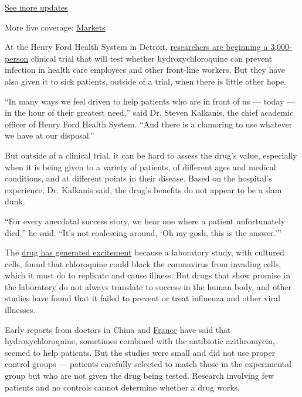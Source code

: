 \href{https://www.nytimes.com/2020/08/01/world/coronavirus-covid-19.html?action=click\&pgtype=Article\&state=default\&region=MAIN_CONTENT_1\&context=storylines_live_updates}{See
more updates}

More live coverage:
\href{https://www.nytimes.com/live/2020/07/31/business/stock-market-today-coronavirus?action=click\&pgtype=Article\&state=default\&region=MAIN_CONTENT_1\&context=storylines_live_updates}{Markets}

At the Henry Ford Health System in Detroit,
\href{https://www.henryford.com/news/2020/04/hfhs-leads-national-study-to-determine-drugs-effectiveness-in-preventing-covid19}{researchers
are beginning a 3,000-person} clinical trial that will test whether
hydroxychloroquine can prevent infection in health care employees and
other front-line workers. But they have also given it to sick patients,
outside of a trial, when there is little other hope.

``In many ways we feel driven to help patients who are in front of us
--- today --- in the hour of their greatest need,'' said Dr. Steven
Kalkanis, the chief academic officer of Henry Ford Health System. ``And
there is a clamoring to use whatever we have at our disposal.''

But outside of a clinical trial, it can be hard to assess the drug's
value, especially when it is being given to a variety of patients, of
different ages and medical conditions, and at different points in their
disease. Based on the hospital's experience, Dr. Kalkanis said, the
drug's benefits do not appear to be a slam dunk.

``For every anecdotal success story, we hear one where a patient
unfortunately died,'' he said. ``It's not coalescing around, `Oh my
gosh, this is the answer.'''

The
\href{https://www.nytimes.com/article/coronavirus-hydroxychloroquine-malaria.html}{drug
has generated excitement} because a laboratory study, with cultured
cells, found that chloroquine could block the coronavirus from invading
cells, which it must do to replicate and cause illness. But drugs that
show promise in the laboratory do not always translate to success in the
human body, and other studies have found that it failed to prevent or
treat influenza and other viral illnesses.

Early reports from doctors in China and
\href{https://www.sciencedirect.com/science/article/pii/S0924857920300996}{France}
have said that hydroxychloroquine, sometimes combined with the
antibiotic azithromycin, seemed to help patients. But the studies were
small and did not use proper control groups --- patients carefully
selected to match those in the experimental group but who are not given
the drug being tested. Research involving few patients and no controls
cannot determine whether a drug works.

